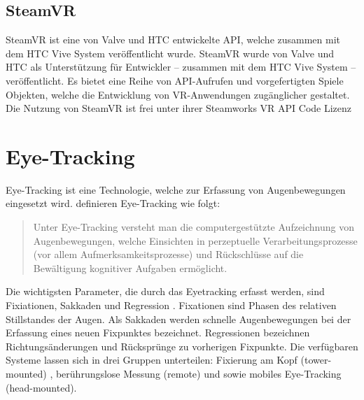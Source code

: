 \subsection{SteamVR}
SteamVR ist eine von Valve und HTC entwickelte API, welche zusammen mit dem HTC Vive System veröffentlicht wurde. 
{\color{red} SteamVR wurde von Valve und HTC als Unterstützung für Entwickler – zusammen mit dem HTC Vive System – veröffentlicht. Es bietet eine Reihe von API-Aufrufen und vorgefertigten Spiele Objekten, welche die Entwicklung von VR-Anwendungen zugänglicher gestaltet. Die Nutzung von SteamVR ist frei unter ihrer Steamworks VR API Code Lizenz}

\section{Eye-Tracking}
Eye-Tracking ist eine Technologie, welche zur Erfassung von Augenbewegungen eingesetzt wird. \citeauthor{BartlPokorny.2013} definieren Eye-Tracking wie folgt: 

\begin{quote}
	\glqq Unter Eye-Tracking versteht man die computergestützte Aufzeichnung von Augenbewegungen, welche Einsichten in perzeptuelle Verarbeitungsprozesse (vor allem Aufmerksamkeitsprozesse) und Rückschlüsse auf die Bewältigung kognitiver Aufgaben ermöglicht.\grqq \cite{BartlPokorny.2013} 
\end{quote}

Die wichtigsten Parameter, die durch das Eyetracking erfasst werden, sind Fixiationen, Sakkaden und Regression \cite{BartlPokorny.2013}. \glqq Fixationen sind Phasen des relativen Stillstandes der Augen.\grqq \cite{Blake.2013} Als Sakkaden werden schnelle Augenbewegungen bei der Erfassung eines neuen Fixpunktes bezeichnet. Regressionen bezeichnen Richtungsänderungen und Rücksprünge zu vorherigen Fixpunkte. Die verfügbaren Systeme lassen sich in drei Gruppen unterteilen: Fixierung am Kopf (tower-mounted) , berührungslose Messung (remote) und sowie mobiles Eye-Tracking (head-mounted). \cite{BartlPokorny.2013}

